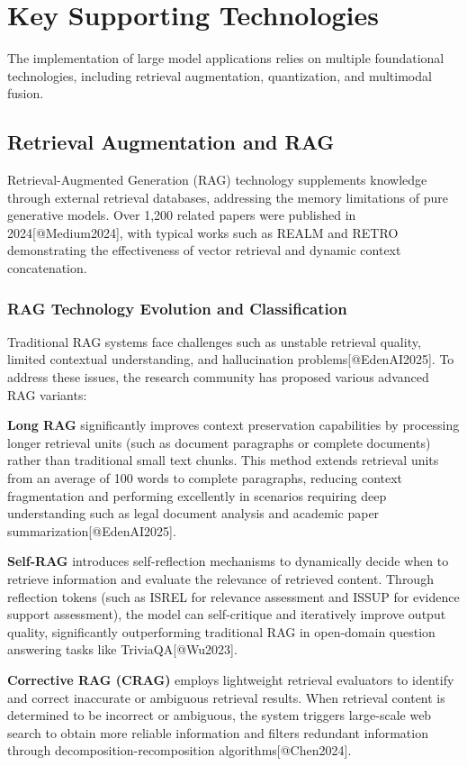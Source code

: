 \documentclass{article}
\begin{document}
\section{Key Supporting Technologies}
The implementation of large model applications relies on multiple foundational technologies, including retrieval augmentation, quantization, and multimodal fusion.

\subsection{Retrieval Augmentation and RAG}
Retrieval-Augmented Generation (RAG) technology supplements knowledge through external retrieval databases, addressing the memory limitations of pure generative models. Over 1,200 related papers were published in 2024[@Medium2024], with typical works such as REALM and RETRO demonstrating the effectiveness of vector retrieval and dynamic context concatenation.

\subsubsection{RAG Technology Evolution and Classification}
Traditional RAG systems face challenges such as unstable retrieval quality, limited contextual understanding, and hallucination problems[@EdenAI2025]. To address these issues, the research community has proposed various advanced RAG variants:

\textbf{Long RAG} significantly improves context preservation capabilities by processing longer retrieval units (such as document paragraphs or complete documents) rather than traditional small text chunks. This method extends retrieval units from an average of 100 words to complete paragraphs, reducing context fragmentation and performing excellently in scenarios requiring deep understanding such as legal document analysis and academic paper summarization[@EdenAI2025].

\textbf{Self-RAG} introduces self-reflection mechanisms to dynamically decide when to retrieve information and evaluate the relevance of retrieved content. Through reflection tokens (such as ISREL for relevance assessment and ISSUP for evidence support assessment), the model can self-critique and iteratively improve output quality, significantly outperforming traditional RAG in open-domain question answering tasks like TriviaQA[@Wu2023].

\textbf{Corrective RAG (CRAG)} employs lightweight retrieval evaluators to identify and correct inaccurate or ambiguous retrieval results. When retrieval content is determined to be incorrect or ambiguous, the system triggers large-scale web search to obtain more reliable information and filters redundant information through decomposition-recomposition algorithms[@Chen2024].
\end{document}
